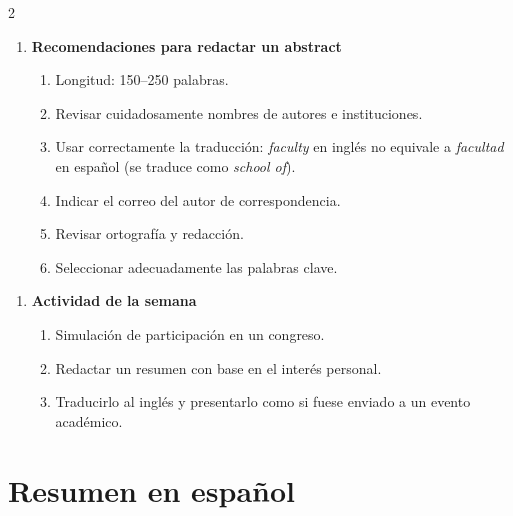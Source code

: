 \documentclass{article}
\newcommand{\PaperTitle}{}        %
\newcommand{\PaperAuthors}{}      %
\newcommand{\PaperAffils}{}       %
\newcommand{\PaperDates}{}        %
\newcommand{\PaperJournal}{}      %
\begin{document}
\setlength{\columnsep}{2cm}
\begin{multicols}{2}

    \begin{enumerate}[label={{\textcolor{trueblue}{\textbf{Ej}. \arabic*.0}}}, start=1]
        \item \textbf{Recomendaciones para redactar un abstract}
        \begin{enumerate}
            \item Longitud: 150--250 palabras.
            \item Revisar cuidadosamente nombres de autores e instituciones.
            \item Usar correctamente la traducción: \textit{faculty} en inglés no equivale a \textit{facultad} en español (se traduce como \textit{school of}).
            \item Indicar el correo del autor de correspondencia.
            \item Revisar ortografía y redacción.
            \item Seleccionar adecuadamente las palabras clave.
        \end{enumerate}
    \end{enumerate}

    \begin{enumerate}[label={{\textcolor{trueblue}{\textbf{Ej}. \arabic*.0}}}, start=2]
        \item \textbf{Actividad de la semana}
        \begin{enumerate}
            \item Simulación de participación en un congreso.
            \item Redactar un resumen con base en el interés personal.
            \item Traducirlo al inglés y presentarlo como si fuese enviado a un evento académico.
        \end{enumerate}
    \end{enumerate}

\end{multicols}


\tableofcontents \newpage


\section{Resumen en español}

\renewcommand{\PaperJournal}{European Congress of Physics 2025, Heraklion, Crete, Greece, 2025}
\renewcommand{\PaperTitle}{Caracterización espectroscópica de muestras de café mexicano mediante técnicas ópticas}
\renewcommand{\PaperAuthors}{Julio Alfredo Ballinas García$^{a,*}$}
\renewcommand{\PaperAffils}{$^{a}$Laboratorio de Caracterización de Materiales, \\
Facultad de Ciencias Físico Matemáticas, \\
Benemérita Universidad Autónoma de Puebla (BUAP), Puebla, México}
\renewcommand{\PaperDates}{Correo de correspondencia: \texttt{julio.ballinas@alumno.buap.mx}}
\end{document}
